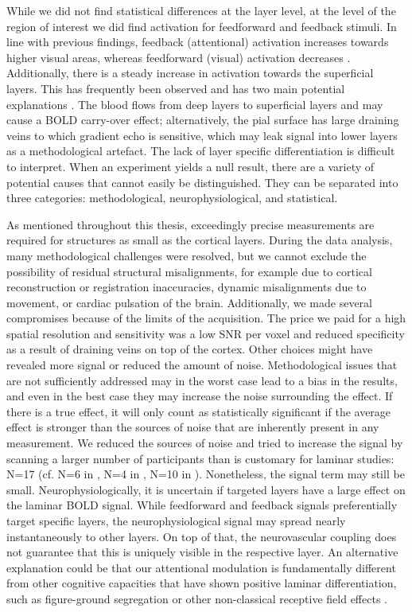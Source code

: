 While we did not find statistical differences at the layer level, at the level of the region of interest we did find activation for feedforward and feedback stimuli. In line with previous findings, feedback (attentional) activation increases towards higher visual areas, whereas feedforward (visual) activation decreases \cite{Murray2008,Jehee2011}. Additionally, there is a steady increase in activation towards the superficial layers. This has frequently been observed and has two main potential explanations \cite{Koopmans2010,Polimeni2010}. The blood flows from deep layers to superficial layers and may cause a BOLD carry-over effect; alternatively, the pial surface has large draining veins to which gradient echo is sensitive, which may leak signal into lower layers as a methodological artefact. The lack of layer specific differentiation is difficult to interpret. When an experiment yields a null result, there are a variety of potential causes that cannot easily be distinguished. They can be separated into three categories: methodological, neurophysiological, and statistical.

As mentioned throughout this thesis, exceedingly precise measurements are required for structures as small as the cortical layers. During the data analysis, many methodological challenges were resolved, but we cannot exclude the possibility of residual structural misalignments, for example due to cortical reconstruction or registration inaccuracies, dynamic misalignments due to movement, or cardiac pulsation of the brain. Additionally, we made several compromises because of the limits of the acquisition. The price we paid for a high spatial resolution and sensitivity was a low SNR per voxel and reduced specificity as a result of draining veins on top of the cortex. Other choices might have revealed more signal or reduced the amount of noise. Methodological issues that are not sufficiently addressed may in the worst case lead to a bias in the results, and even in the best case they may increase the noise surrounding the effect. If there is a true effect, it will only count as statistically significant if the average effect is stronger than the sources of noise that are inherently present in any measurement. We reduced the sources of noise and tried to increase the signal by scanning a larger number of participants than is customary for laminar studies: N=17 (cf. N=6 in \cite{Polimeni2010}, N=4 in \cite{Muckli2015}, N=10 in \cite{Kok2016}). Nonetheless, the signal term may still be small. Neurophysiologically, it is uncertain if targeted layers have a large effect on the laminar BOLD signal. While feedforward and feedback signals preferentially target specific layers, the neurophysiological signal may spread nearly instantaneously to other layers. On top of that, the neurovascular coupling does not guarantee that this is uniquely visible in the respective layer. An alternative explanation could be that our attentional modulation is fundamentally different from other cognitive capacities that have shown positive laminar differentiation, such as figure-ground segregation \cite{Kok2016} or other non-classical receptive field effects \cite{Muckli2015}.

